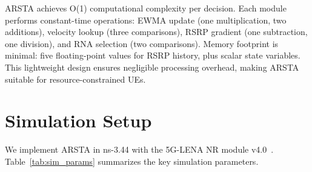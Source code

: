 \documentclass[conference]{IEEEtran}
\begin{document}
ARSTA achieves O(1) computational complexity per decision. Each module performs constant-time operations: EWMA update (one multiplication, two additions), velocity lookup (three comparisons), RSRP gradient (one subtraction, one division), and RNA selection (two comparisons). Memory footprint is minimal: five floating-point values for RSRP history, plus scalar state variables. This lightweight design ensures negligible processing overhead, making ARSTA suitable for resource-constrained UEs.



\section{Simulation Setup}
\label{sec:simulation}

We implement ARSTA in ns-3.44 with the 5G-LENA NR module v4.0~\cite{Polese2021}. Table~\ref{tab:sim_params} summarizes the key simulation parameters.
\end{document}
